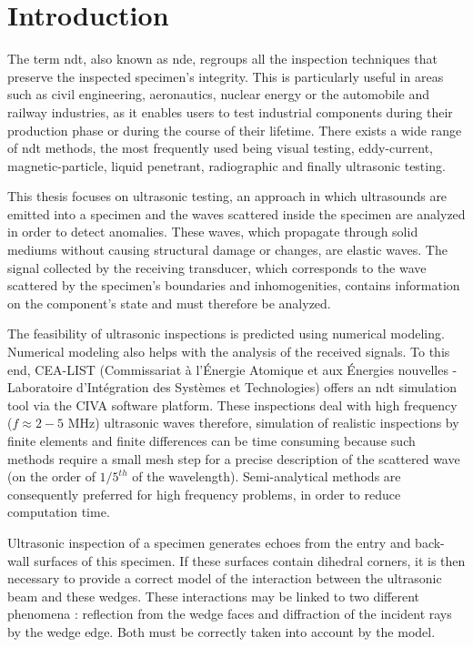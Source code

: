 \chapter*{Introduction}

The term \acrfull{ndt}, also known as \acrfull{nde}, regroups all the inspection techniques that preserve the inspected specimen's integrity. This is particularly useful in areas such as civil engineering, aeronautics, nuclear energy or the automobile and railway industries, as it enables users to test industrial components during their production phase or during the course of their lifetime. There exists a wide range of \acrshort{ndt} methods, the most frequently used being visual testing, eddy-current, magnetic-particle, liquid penetrant, radiographic and finally ultrasonic testing. 

This thesis focuses on ultrasonic testing, an approach in which ultrasounds are emitted into a specimen and the waves scattered inside the specimen are analyzed in order to detect anomalies. These waves, which propagate through solid mediums without causing structural damage or changes, are elastic waves. The signal collected by the receiving transducer, which corresponds to the wave scattered by the specimen's boundaries and inhomogenities, contains information on the component's state and must therefore be analyzed.

The feasibility of ultrasonic inspections is predicted using numerical modeling. Numerical modeling also helps with the analysis of the received signals. To this end, CEA-LIST (Commissariat à l’Énergie Atomique et aux Énergies nouvelles - Laboratoire d’Intégration des Systèmes et Technologies) offers an \acrshort{ndt} simulation tool via the CIVA software platform. These inspections deal with high frequency ($f \approx 2-5$ MHz) ultrasonic waves therefore, simulation of realistic inspections by finite elements and finite differences can be time consuming because such methods require a small mesh step for a precise description of the scattered wave (on the order of $1/5^{th}$ of the wavelength). Semi-analytical methods are consequently preferred for high frequency problems, in order to reduce computation time. %

Ultrasonic inspection of a specimen generates echoes from the entry and back-wall surfaces of this specimen. If these surfaces contain dihedral corners, it is then necessary to provide a correct model of the interaction between the ultrasonic beam and these wedges. These interactions may be linked to two different phenomena : reflection from the wedge faces and diffraction of the incident rays by the wedge edge. Both must be correctly taken into account by the model.

